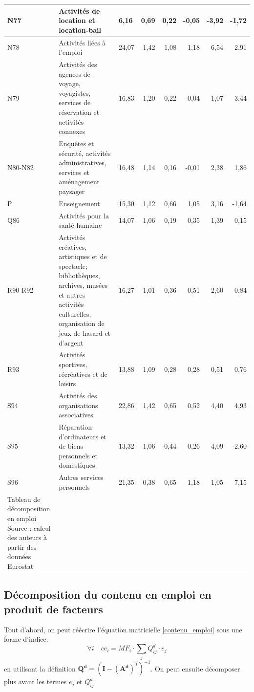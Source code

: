 \begin{small}
\begin{longtable}{m{1.3cm}m{5.7cm}m{1cm}rrrrr}
	\hline
	N77 & Activités de location et location-bail & 6,16 & 0,69 & 0,22 & -0,05 & -3,92 & -1,72 \\ 
	\hline
	N78 & Activités liées à l'emploi & 24,07 & 1,42 & 1,08 & 1,18 & 6,54 & 2,91 \\ 
	\hline
	N79 & Activités des agences de voyage, voyagistes, services de réservation et activités connexes & 16,83 & 1,20 & 0,22 & -0,04 & 1,07 & 3,44 \\ 
	\hline
	N80-N82 & Enquêtes et sécurité, activités administratives, services et aménagement paysager & 16,48 & 1,14 & 0,16 & -0,01 & 2,38 & 1,86 \\ 
	\hline
	P & Enseignement & 15,30 & 1,12 & 0,66 & 1,05 & 3,16 & -1,64 \\ 
	\hline
	Q86 & Activités pour la santé humaine & 14,07 & 1,06 & 0,19 & 0,35 & 1,39 & 0,15 \\ 
	\hline
	R90-R92 & Activités créatives, artistiques et de spectacle; bibliothèques, archives, musées et autres activités culturelles; organisation de jeux de hasard et d'argent & 16,27 & 1,01 & 0,36 & 0,51 & 2,60 & 0,84 \\ 
	\hline
	R93 & Activités sportives, récréatives et de loisirs & 13,88 & 1,09 & 0,28 & 0,28 & 0,51 & 0,76 \\ 
	\hline
	S94 & Activités des organisations associatives & 22,86 & 1,42 & 0,65 & 0,52 & 4,40 & 4,93 \\ 
	\hline
	S95 & Réparation d'ordinateurs et de biens personnels et domestiques & 13,32 & 1,06 & -0,44 & 0,26 & 4,09 & -2,60 \\ 
	\hline
	S96 & Autres services personnels & 21,35 & 0,38 & 0,65 & 1,18 & 1,05 & 7,15 \\ 
	\hline
	\hline
	\caption{Tableau de décomposition en emploi \\ Source : calcul des auteurs à partir des données Eurostat} 
	\label{tab:decompo_ce}
\end{longtable}
\end{small}

\clearpage
\subsection{Décomposition du contenu en emploi en produit de facteurs}

Tout d'abord, on peut réécrire l'équation matricielle \ref{contenu_emploi} sous une forme d'indice. 
\begin{equation}
\forall i \quad ce_i = MF_i \cdot \sum_j Q^d_{ij} \cdot e_j
\label{decompo_initiale}
\end{equation}
en utilisant la définition $\pmb{Q^d} = (\pmb{I} - (\pmb{A^d})^T)^{-1}$. On peut ensuite décomposer plus avant les termes $e_j$ et $Q^d_{ij}$.

